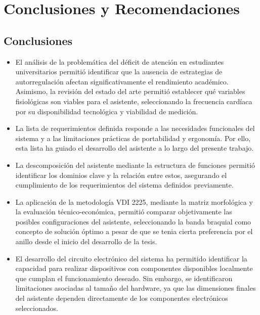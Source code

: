
\chapter{Conclusiones y Recomendaciones}

\section{Conclusiones}


\begin{itemize}
    \item El análisis de la problemática del déficit de atención en estudiantes universitarios permitió identificar que la ausencia de estrategias de autorregulación afectan significativamente el rendimiento académico. Asimismo, la revisión del estado del arte permitió establecer qué variables fisiológicas son viables para el asistente, seleccionando la frecuencia cardíaca por su disponibilidad tecnológica y viabilidad de medición.
    
    \item La lista de requerimientos definida responde a las necesidades funcionales del sistema y a las limitaciones prácticas de portabilidad y ergonomía. Por ello, esta lista ha guiado el desarrollo del asistente a lo largo del presente trabajo. 
    
    \item La descomposición del asistente mediante la estructura de funciones permitió identificar los dominios clave y la relación entre estos, asegurando el cumplimiento de los requerimientos del sistema definidos previamente.
    
    \item La aplicación de la metodología VDI 2225, mediante la matriz morfológica y la evaluación técnico-económica, permitió comparar objetivamente las posibles configuraciones del asistente, seleccionando la banda braquial como concepto de solución óptimo a pesar de que se tenia cierta preferencia por el anillo desde el inicio del desarrollo de la tesis.

    \item El desarrollo del circuito electrónico del sistema ha permitido identificar la capacidad para realizar dispositivos con componentes disponibles localmente que cumplan el funcionamiento deseado. Sin embargo, se identificaron limitaciones asociadas  al tamaño del hardware, ya que las dimensiones finales del asistente dependen directamente de los componentes electrónicos seleccionados.
    

\end{itemize}
